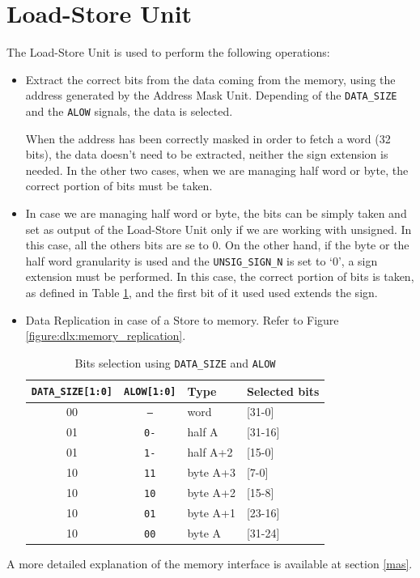 \section{Load-Store Unit}
\label{sec:ldstr}
The Load-Store Unit is used to perform the following operations:
\begin{itemize}
	\item Extract the correct bits from the data coming from the memory, using the address generated by the Address Mask Unit. Depending of the \texttt{DATA\_SIZE} and the \texttt{ALOW} signals, the data is selected.
	
	When the address has been correctly masked in order to fetch a word (32 bits), the data doesn't need to be extracted, neither the sign extension is needed. In the other two cases, when we are managing half word or byte, the correct portion of bits must be taken. 

	\item In case we are managing half word or byte, the bits can be simply taken and set as output of the Load-Store Unit only if we are working with unsigned. In this case, all the others bits are se to 0. On the other hand, if the byte or the half word granularity is used and the \texttt{UNSIG\_SIGN\_N} is set to `0', a sign extension must be performed. In this case, the correct portion of bits is taken, as defined in Table \ref{tab:addr_selection}, and the first bit of it used used extends the sign.

	\item Data Replication in case of a Store to memory. Refer to Figure \ref{figure:dlx:memory_replication}.  


	\begin{table}[H]
		\begin{center}
			\begin{tabular}{ |c| c | l | l|}
				\hline
				\texttt{DATA\_SIZE[1:0]} & \texttt{ALOW[1:0]} & \textbf{Type} & \textbf{Selected bits}\\
				\hline
				00 & \texttt{--} & word & [31-0]\\
				01 & \texttt{0-} & half A & [31-16]\\
				01 & \texttt{1-} & half A+2 & [15-0]\\
				10 & \texttt{11} & byte A+3 & [7-0]\\
				10 & \texttt{10} & byte A+2 & [15-8]\\
				10 & \texttt{01} & byte A+1 & [23-16]\\
				10 & \texttt{00} & byte A & [31-24]\\
				\hline
				
			\end{tabular}
			\caption{Bits selection using \texttt{DATA\_SIZE} and \texttt{ALOW}}
			\label{tab:addr_selection}
		\end{center}
	\end{table}

	
\end{itemize}
A more detailed explanation of the memory interface is available at section \ref{mas}.